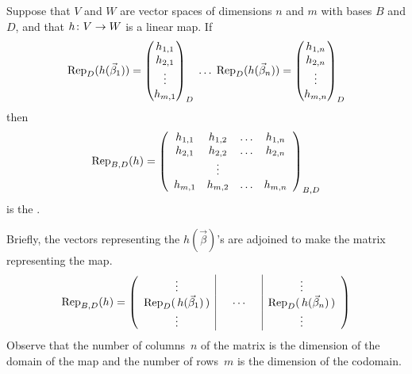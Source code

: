 \begin{definition} \label{def:MatRepMap}
Suppose that \( V \) and \( W \) are vector spaces of dimensions \( n \) and
\( m \) with bases \( B \) and \( D \),
and that \( \map{h}{V}{W} \) is a linear map.
If
\begin{equation*}
  \rep{h( \vec{\beta}_1 )}{D}
  =
  \colvec{h_{1,1} \\ h_{2,1} \\ \vdots \\ h_{m,1}}_D
  \;\ldots\;
  \rep{h( \vec{\beta}_n )}{D}
  =
  \colvec{h_{1,n} \\ h_{2,n} \\ \vdots \\ h_{m,n}}_D
\end{equation*}
then 
\begin{equation*}
  \rep{h}{B,D}=\generalmatrix{h}{n}{m}_{B,D}
\end{equation*}
is the .%
%
\end{definition}

Briefly, the vectors
representing the $h(\vec{\beta})$'s are adjoined to 
make the matrix representing the map. 
\begin{equation*}
  \rep{h}{B,D}=
  \left(\begin{array}{c|@{\hspace{1.5em}}c@{\hspace{1.5em}}|c}
     \vdots                         &       &\vdots    \\
     \rep{\,h(\vec{\beta}_1)\,}{D}  &\cdots &\rep{\,h(\vec{\beta}_n)\,}{D}  \\
     \vdots                         &       &\vdots
  \end{array}\right)
\end{equation*}
Observe that the number of columns~$n$ of the matrix is the 
dimension of the domain of the map 
and the number of rows~$m$ is the dimension of the codomain.


